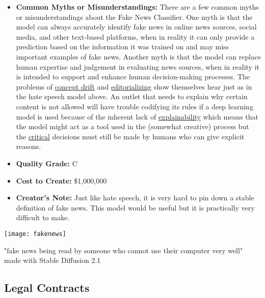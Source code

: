 \begin{itemize}
    \item \textbf{Common Myths or Misunderstandings:} There are a few common myths or misunderstandings about the Fake News Classifier. One myth is that the model can always accurately identify fake news in online news sources, social media, and other text-based platforms, when in reality it can only provide a prediction based on the information it was trained on and may miss important examples of fake news. Another myth is that the model can replace human expertise and judgement in evaluating news sources, when in reality it is intended to support and enhance human decision-making processes. The problems of \hyperref[sec:drift]{concept drift} and \hyperref[sec:janitor]{editorializing} show themselves hear just as in the hate speech model above. An outlet that needs to explain why certain content is not allowed will have trouble codifying its rules if a deep learning model is used because of the inherent lack of \hyperref[sec:explain]{explainability} which means that the model might act as a tool used in the (somewhat creative) process but the \hyperref[sec:creative]{critical} decisions must still be made by humans who can give explicit reasons.
    \item \textbf{Quality Grade:} C
    \item \textbf{Cost to Create:} \$1,000,000
    \item \textbf{Creator's Note:} Just like hate speech, it is very hard to pin down a stable definition of fake news. This model would be useful but it is practically very difficult to make.
\end{itemize}

\begin{marginfigure}[-5.5cm]
        \texttt{[image: fakenews]}
        \caption{"fake news being read by someone who cannot use their computer very well" made with Stable Diffusion 2.1}
\end{marginfigure}

\subsection{Legal Contracts}

